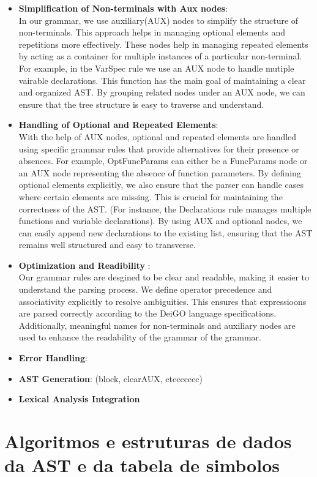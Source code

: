 \documentclass[12pt]{article}
\begin{document}
\begin{itemize}
    \item \textbf{Simplification of Non-terminals with Aux nodes}: \\In our grammar, we use auxiliary(AUX) nodes to simplify the structure of non-terminals. This approach helps in managing optional elements and repetitions more effectively. These nodes help in managing repeated elements by acting as a container for multiple instances of a particular non-terminal. For example, in the VarSpec rule we use an AUX node to handle mutiple vairable declarations. This function has the main goal of maintaining a clear and organized AST. By grouping related nodes under an AUX node, we can ensure that the tree structure is easy to traverse and understand. 
    \item \textbf{Handling of Optional and Repeated Elements}: \\ With the help of AUX nodes, optional and repeated elements are handled using specific grammar rules that provide alternatives for their presence or absences. For example,
    OptFuncParams can either be a FuncParams node or an AUX node representing the absence of function parameters. By defining optional elements explicitly, we also ensure that the parser can handle cases where certain elements are missing. This is crucial for maintaining the correctness of the AST. (For instance, the Declarations rule manages multiple functions and variable declarations). By using AUX and optional nodes, we can easily append new declarations to the existing list, ensuring that the AST remains well structured and easy to transverse.
    \item \textbf{Optimization and Readibility }: \\ Our grammar rules are desgined to be clear and readable, making it easier to understand the parsing process. We define operator precedence and associativity explicitly to resolve ambiguities. This ensures that expressioons are parsed correctly according to the DeiGO language specifications. Additionally, meaningful names for non-terminals and auxiliary nodes are used to enhance the readability of the grammar of the grammar.
    \item \textbf{Error Handling}: 
    \item \textbf{AST Generation}: (block, clearAUX, etccccccc) 
    \item \textbf{Lexical Analysis Integration}
\end{itemize}


\section{Algoritmos e estruturas de dados da AST e da tabela de simbolos}
\end{document}
